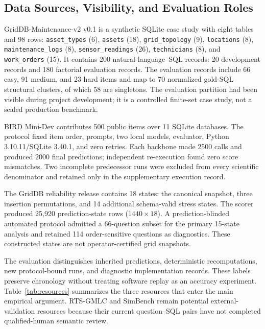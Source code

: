 \documentclass[information,article,submit,moreauthors]{Definitions/mdpi}
\begin{document}
\subsection{Data Sources, Visibility, and Evaluation Roles}

GridDB-Maintenance-v2 v0.1 is a synthetic SQLite case study with eight tables and 98 rows: \texttt{asset\_types} (6), \texttt{assets} (18), \texttt{grid\_topology} (9), \texttt{locations} (8), \texttt{maintenance\_logs} (8), \texttt{sensor\_readings} (26), \texttt{technicians} (8), and \texttt{work\_orders} (15). It contains 200 natural-language--SQL records: 20 development records and 180 factorial evaluation records. The evaluation records include 66 easy, 91 medium, and 23 hard items and map to 70 normalized gold-SQL structural clusters, of which 58 are singletons. The evaluation partition had been visible during project development; it is a controlled finite-set case study, not a sealed production benchmark.

BIRD Mini-Dev contributes 500 public items over 11 SQLite databases. The protocol fixed item order, prompts, two local models, evaluator, Python 3.10.11/SQLite 3.40.1, and zero retries. Each backbone made 2500 calls and produced 2000 final predictions; independent re-execution found zero score mismatches. Two incomplete predecessor runs were excluded from every scientific denominator and retained only in the supplementary execution record.

The GridDB reliability release contains 18 states: the canonical snapshot, three insertion permutations, and 14 additional schema-valid stress states. The scorer produced 25,920 prediction-state rows ($1440\times18$). A prediction-blinded automated protocol admitted a 66-question subset for the primary 15-state analysis and retained 114 order-sensitive questions as diagnostics. These constructed states are not operator-certified grid snapshots.

The evaluation distinguishes inherited predictions, deterministic recomputations, new protocol-bound runs, and diagnostic implementation records. These labels preserve chronology without treating software replay as an accuracy experiment. Table~\ref{tab:resources} summarizes the three resources that enter the main empirical argument. RTS-GMLC and SimBench remain potential external-validation resources because their current question--SQL pairs have not completed qualified-human semantic review.
\end{document}
